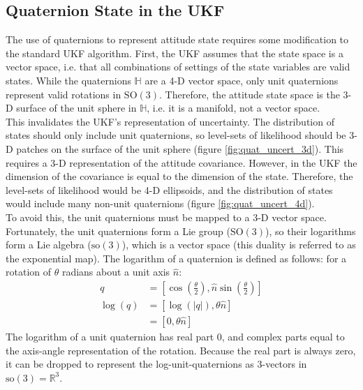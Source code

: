 \documentclass[conference]{IEEEtran}
\begin{document}
\subsection{Quaternion State in the UKF}
\label{sect:quat_ukf_problems}
The use of quaternions to represent attitude state requires some modification to the standard UKF algorithm. First, the UKF assumes
that the state space is a vector space, i.e. that all combinations of settings of the state variables are valid states. While the quaternions $\mathbb{H}$ are a 4-D vector space, only unit quaternions represent valid rotations in $\mathrm{SO(3)}$. Therefore, the attitude state space is the 3-D surface of the unit sphere in $\mathbb{H}$, i.e. it is a manifold, not a vector space.\\

This invalidates the UKF's representation of uncertainty. The distribution of states should only include unit quaternions, so level-sets of likelihood should be 3-D patches on the surface of the unit sphere (figure \ref{fig:quat_uncert_3d}). This requires a 3-D representation of the attitude covariance. However, in the UKF the dimension of the covariance is equal to the dimension of the state. Therefore, the level-sets of likelihood would be 4-D ellipsoids, and the distribution of states would include many non-unit quaternions (figure \ref{fig:quat_uncert_4d}).\\

To avoid this, the unit quaternions must be mapped to a 3-D vector space. Fortunately, the unit quaternions form a Lie group ($\mathrm{SO(3)}$), so their logarithms form a Lie algebra ($\mathrm{so(3)}$), which is a vector space (this duality is referred to as the exponential map). The logarithm of a quaternion is defined as follows: for a rotation of $\theta$ radians about a unit axis $\hat{n}$:
\begin{align}
    q &= [\cos(\frac{\theta}{2}), \hat{n} \sin(\frac{\theta}{2})] \\
    \log(q) &= [\log(|q|), \theta \hat{n}]\\
        &= [0, \theta \hat{n}]
\end{align}
The logarithm of a unit quaternion has real part 0, and complex parts equal to the axis-angle representation of the rotation. Because the real part is always zero, it can be dropped to represent the log-unit-quaternions as 3-vectors in $\mathrm{so(3)} = \mathbb{R}^3$.\\
\end{document}
